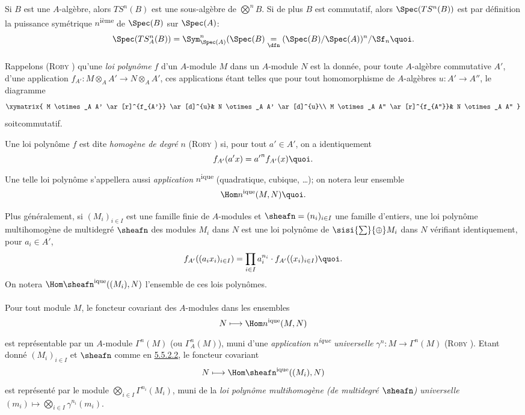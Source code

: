 \documentclass[10pt]{../fichiers-configuration-latex/smfart}
\begin{document}
Si $B$ est une $A$-algèbre, alors $TS^{n}(B)$ est une sous-algèbre de
$\bigotimes\limits^{n}B$. Si de plus $B$ est commutatif,
alors $\Spec (TS^{n}(B))$ est par définition la puissance symétrique
$n$\textsuperscript{ième} de $\Spec(B)$ sur $\Spec(A)$:
$$
\Spec(TS^{n}_{A}(B))=\Sym^{n}_{\Spec(A)}(\Spec(B)\underset{\dfn}{=}(\Spec(B)/\Spec(A))^{n}/\Sf_n{\quoi}.
$$

\paragraph{}
Rappelons (\textsc{Roby} \cite[I ]{SGA4-17:Ro}) qu'une \emph{loi polynôme} $f$ d'un
$A$-module $M$ dans un $A$-module $N$ est la donnée, pour toute
$A$-algèbre commutative $A'$, d'une application
$f_{A'}:M\otimes_{A}A'\rightarrow N\otimes_{A}A'$, ces applications
étant telles que pour tout homomorphisme de $A$-algèbres
$u:A'\rightarrow A''$, le diagramme
\[
\xymatrix{
M \otimes_A A'  \ar[r]^{f_{A'}} \ar[d]^{u}& N \otimes_A A' \ar[d]^{u}\\
M \otimes_A A'' \ar[r]^{f_{A''}}& N \otimes_A A''
}
\]
soit\pageoriginale commutatif.

Une loi polynôme $f$ est dite \emph{homogène de degré} $n$ (\textsc{Roby} \cite[I
 p.~226]{SGA4-17:Ro}) si, pour tout $a'\in A'$, on a identiquement
\[
f_{A'}(a'x)={a'}^{n}f_{A'}(x){\quoi}.
\]
Une telle loi polynôme s'appellera aussi \emph{application}
$n$\textsuperscript{ique} (quadratique, cubique, \ldots); on notera leur
ensemble
\[
\Hom n^{\text{\rm ique}} (M,N){\quoi}.
\]

Plus généralement, si $(M_{i})_{i\in I}$ est une famille finie de
$A$-modules et $\sheafn =(n_{i})_{i\in I}$ une famille d'entiers, une loi
polynôme multihomogène de multidegré $\sheafn $ des modules $M_{i}$ dans
$N$ est une loi polynôme de $\sisi{\sum}{\oplus} M_{i}$ dans $N$ vérifiant
identiquement, pour $a_{i}\in A'$,
\[
f_{A'}((a_{i}x_{i})_{i\in I})=\prod_{i\in I} a^{n_{i}}_i\cdot
f_{A'}((x_{i})_{i\in I}){\quoi}.
\]
On notera $\Hom \sheafn ^{\text{\rm ique}}((M_{i}),N)$ l'ensemble de ces
lois polynômes.

\paragraph{}
Pour tout module $M$, le foncteur covariant des $A$-modules dans les
ensembles
$$
N\longmapsto \Hom n^{\text{\rm ique}} (M,N)
$$
est représentable par un $A$-module $\Gamma^{n}(M)$ (ou
$\Gamma^{n}_{A}(M)$), muni d'une \emph{application\pageoriginale
$n$\textsuperscript{ique} universelle} $\gamma^{n}:M\rightarrow
\Gamma^{n}(M)$ (\textsc{Roby} \cite[IV 1 ]{SGA4-17:Ro}). Etant donné $(M_{i})_{i\in I}$
et $\sheafn $ comme en \hyperref[XVII.par5.5.2.2]{5.5.2.2}, le foncteur covariant
$$
N\longmapsto \Hom \sheafn ^{\text{\rm ique}} ((M_{i}),N)
$$
est représenté par le module $\bigotimes\limits_{i\in
I}\Gamma^{n_i}(M_{i})$, muni de la \emph{loi polynôme multihomogène
(de multidegré $\sheafn $) universelle} $(m_{i})\mapsto
\bigotimes\limits_{i\in I}\gamma^{n_{i}}(m_{i})$.
\end{document}

